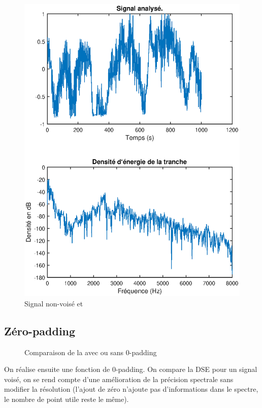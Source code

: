 \documentclass[french]{article}
\begin{document}
\begin{figure}[h!]
\begin{minipage}{0.45\textwidth}
	\includegraphics[width=\textwidth]{images/tfd_nonvoise.eps}
	\caption{Signal non-voisé et }
	\label{fig:dse_nonvois}
	\end{minipage}
\end{figure}



\FloatBarrier
\subsection{Zéro-padding}
\begin{figure}[h!]
	\centering
	
	\caption{Comparaison de la  avec ou sans 0-padding}
	\label{fig:dse_0_padding}
\end{figure}
On réalise ensuite une fonction de 0-padding. On compare la DSE pour un signal voisé, on se rend compte d'une amélioration de la précision spectrale sans modifier la résolution (l'ajout de zéro n'ajoute pas d'informations dans le spectre, le nombre de point utile reste le même).
\end{document}
